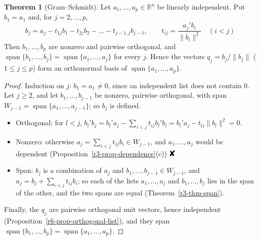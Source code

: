 \documentclass[12pt]{article}
\newcommand{\R}{\mathbb R}
\newcommand{\contradiction}{\mathord{\text{\large\ding{56}}}}
\DeclareMathOperator{\Span}{span}
\theoremstyle{definition}
\newtheorem{theorem}{Theorem}
\begin{document}
\begin{theorem}[Gram--Schmidt]\label{r6-thm-gram-schmidt}
Let \(a_1,\dots,a_p\in\R^n\) be linearly independent. Put \(b_1=a_1\) and, for \(j=2,\dots,p\),
\[
b_j=a_j-t_{1j}b_1-t_{2j}b_2-\dots-t_{j-1,j}b_{j-1},\qquad t_{ij}=\frac{a_j'b_i}{\lVert b_i\rVert^2}\quad(i<j)
\]
Then \(b_1,\dots,b_p\) are nonzero and pairwise orthogonal, and
\(\Span\{b_1,\dots,b_j\}=\Span\{a_1,\dots,a_j\}\) for every \(j\). Hence the vectors
\(q_j=b_j/\lVert b_j\rVert\) (\(1\leqslant j\leqslant p\)) form an orthonormal basis of
\(\Span\{a_1,\dots,a_p\}\).
\end{theorem}
\begin{proof}
Induction on \(j\): \(b_1=a_1\ne0\), since an independent list does not contain \(0\). Let
\(j\geqslant2\), and let \(b_1,\dots,b_{j-1}\) be nonzero, pairwise orthogonal, with span
\(W_{j-1}=\Span\{a_1,\dots,a_{j-1}\}\); so \(b_j\) is defined.
\begin{itemize}
\item Orthogonal: for \(l<j\), \(b_l'b_j=b_l'a_j-\sum_{i<j}t_{ij}b_l'b_i=b_l'a_j-t_{lj}\lVert b_l\rVert^2=0\).
\item Nonzero: otherwise \(a_j=\sum_{i<j}t_{ij}b_i\in W_{j-1}\), and \(a_1,\dots,a_j\) would be dependent
(Proposition~\ref{r3-prop-dependence}(c)) \(\contradiction\)
\item Span: \(b_j\) is a combination of \(a_j\) and \(b_1,\dots,b_{j-1}\in W_{j-1}\), and
\(a_j=b_j+\sum_{i<j}t_{ij}b_i\); so each of the lists \(a_1,\dots,a_j\) and \(b_1,\dots,b_j\) lies in the
span of the other, and the two spans are equal (Theorem~\ref{r3-thm-span}).
\end{itemize}
Finally, the \(q_j\) are pairwise orthogonal unit vectors, hence independent
(Proposition~\ref{r6-prop-orthogonal-list}), and they span \(\Span\{b_1,\dots,b_p\}=\Span\{a_1,\dots,a_p\}\).
\end{proof}
\end{document}
